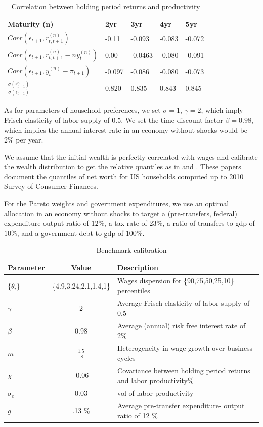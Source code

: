 \documentclass[thmsb,11pt]{article}
\begin{document}
\begin{table}[htp]
\begin{tabular}{|l|l| l|l|l|}
\hline
Maturity (n) &2yr & 3yr & 4yr & 5yr\\
\hline
$Corr(\epsilon_{t+1},r^{(n)}_{t,t+1})$ & -0.11 &-0.093 &-0.083 &-0.072\\
$Corr(\epsilon_{t+1},r^{(n)}_{t,t+1}-ny^{(n)}_{t})$& 0.00 & -0.0463 &-0.080& -0.091\\
$Corr(\epsilon_{t+1},y^{(n)}_{t}-\pi_{t+1})$ &-0.097  &-0.086  &-0.080  &-0.073 \\
$\frac{\sigma({r^{n}_{t+1}})}{\sigma({\epsilon_{t+1}})}$  &0.820  &0.835  &0.843  &0.845\\
\hline
\end{tabular}
\caption{Correlation between holding period returns and productivity}
\label{tab:corr}
\end{table}



 As for  parameters of  household preferences, we set $\sigma=1$, $\gamma=2$, which imply Frisch elasticity of labor supply of $0.5$.
 We set the time discount factor $\beta=0.98$, which implies  the annual interest rate in an economy without shocks would be $2\%$ per year.

 We assume that the initial wealth is perfectly correlated with wages and calibrate the wealth distribution to get the relative quantiles as in \cite{Kuhn2014} and \cite{QuadriniRull2014}. %
 These papers document the quantiles of net worth for US households computed up to 2010 Survey of Consumer Finances.

 For the Pareto weights and government expenditures, we use an optimal allocation in an economy without shocks to target a (pre-transfers, federal) expenditure output ratio of $12\%$,
 a tax rate of $23\%$, a ratio of transfers to gdp of $10\%$, and a government debt to gdp of $100\%$.



\begin{table}[htp]
\begin{tabular}{|l|c|p{4cm}|}
\hline
Parameter & Value & Description   \\ \hline
$\{\bar{\theta}_i\} $ & \{4.9,3.24,2.1,1.4,1\} & Wages dispersion for \{90,75,50,25,10\} percentiles   \\
$\gamma$ & 2 & Average Frisch elasticity of labor supply of 0.5 \\
$\beta$ & 0.98  &Average (annual) risk free interest rate of 2\%   \\
$m$ &$\frac{1.5}{.8}$& Heterogeneity in wage growth over business cycles\\
$\chi$ & -0.06 &Covariance between holding period returns and labor productivity\% \\
$\sigma_e$ & 0.03 & vol of labor productivity\\
$g$ & .13 \%&Average pre-transfer expenditure- output ratio of 12 \% \\\hline
\end{tabular}
\caption{Benchmark calibration}
\label{tab:Parameters}
\end{table}
\end{document}
